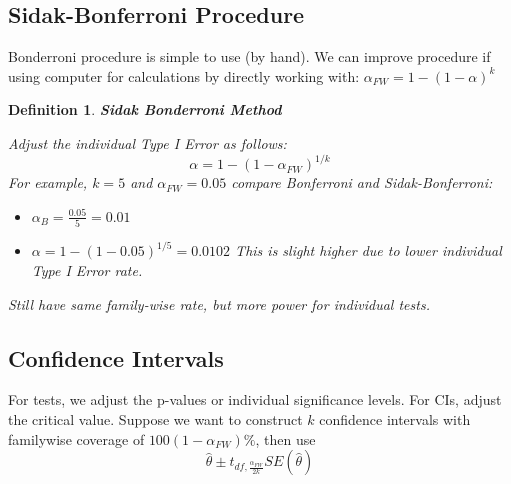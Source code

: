 \documentclass[a4paper,11pt]{article}
\newtheorem{defn}[thm]{Definition}
\begin{document}
\subsection{Sidak-Bonferroni Procedure}
Bonderroni procedure is simple to use (by hand). We can improve procedure if using computer for calculations by directly working with: $\alpha_{FW}=1-(1-\alpha)^k$ 
\begin{defn}
\normalfont
\textbf{Sidak Bonderroni Method}

Adjust the individual Type I Error as follows: 
$$\alpha=1-(1-\alpha_{FW})^{1/k}$$
For example, $k=5$ and $\alpha_{FW}=0.05$ compare Bonferroni and Sidak-Bonferroni: 
\begin{itemize}
\item $\alpha_B=\frac{0.05}{5}=0.01$
\item $\alpha=1-(1-0.05)^{1/5}=0.0102$ This is slight higher due to lower individual Type I Error rate.
\end{itemize}
Still have same family-wise rate, but more power for individual tests.
\end{defn}
\newpage
\subsection{Confidence Intervals}
For tests, we adjust the p-values or individual significance levels. For CIs, adjust the critical value. Suppose we want to construct $k$ confidence intervals with familywise coverage of $100(1-\alpha_{FW})\%$, then use
$$\hat{\theta}\pm t_{df,\frac{\alpha_{FW}}{2k}}SE(\hat{\theta})$$
\end{document}
